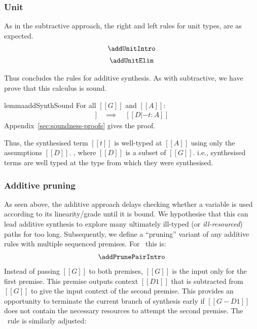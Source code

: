 \subsubsection{Unit}
As in the subtractive approach, the right and left rules for unit types, are
as expected.
\begin{align*}
\begin{array}{c}
  \addUnitIntro
  \\[0.5em]
  \addUnitElim
\end{array}
  \end{align*}


  Thus concludes the rules for additive synthesis. As with subtractive, we
  have prove that this calculus is sound.
  \begin{restatable}{lemma}{addSynthSound}
\label{lemma:addSynthSound} For all $[[ G ]]$ and $[[ A ]]$:
%
\begin{align*}
[[ G |- A =>+ t ; D ]] \quad \implies \quad [[ D |- t : A ]]
\end{align*}
Appendix~\ref{sec:soundness-proofs} gives the proof.
\end{restatable}
Thus, the synthesised term $[[ t ]]$ is well-typed
at $[[ A ]]$ using only the assumptions $[[ D ]]$.
, where $[[D]]$ is a
subset of $[[G]]$.
i.e., synthesised terms are well typed at the type from which they
were synthesised.

\subsubsection{Additive pruning}
%
As seen above, the additive approach delays checking
whether a variable is used according to its linearity/grade
until it is bound. We hypothesise that this can lead additive synthesis to explore
many ultimately ill-typed (or \emph{ill-resourced})
paths for too long. Subsequently, we define a ``pruning''
variant of any additive rules with multiple sequenced
premises. For \addPairIntroName\ this is:
%
\begin{align*}
  \begin{array}{c}
    \addPrunePairIntro
  \end{array}
\end{align*}
%
Instead of passing $[[G]]$ to both
premises, $[[G]]$ is the input only for
the first premise. This premise outputs context $[[D1]]$ that
is subtracted from $[[G]]$ to give the input context
of the second premise. This provides an opportunity to
terminate the current branch of synthesis early if $[[ G - D1
]]$ does not contain the necessary resources to attempt the
second premise.
The \addAppName\ rule is similarly adjusted:

